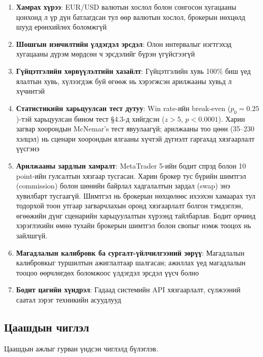 \begin{enumerate}
    \item \textbf{Хамрах хүрээ}: EUR/USD валютын хослол болон сонгосон хугацааны цонхонд л үр дүн батлагдсан тул өөр валютын хослол, брокерын нөхцөлд шууд ерөнхийлөх боломжгүй
    \item \textbf{Шошгын нэвчилтийн үлдэгдэл эрсдэл}: Олон интервалыг нэгтгэхэд хугацааны дүрэм мөрдсөн ч эрсдэлийг бүрэн үгүйсгээгүй
    \item \textbf{Гүйцэтгэлийн хөрвүүлэлтийн хазайлт}: Гүйцэтгэлийн хувь 100\% биш үед ялалтын хувь, хүлээгдэж буй өгөөж нь хэрэгжсэн арилжааны хувьд л хүчинтэй
    \item \textbf{Статистикийн харьцуулсан тест дутуу}: Win rate-ийн break-even ($p_0=0.25$)-тэй харьцуулсан бином тест §4.3-д хийгдсэн ($z>5$, $p<0.0001$). Харин загвар хоорондын McNemar's тест явуулаагүй; арилжааны тоо цөөн (35--230 хэлцэл) нь сценари хоорондын ялгааны хүчтэй дүгнэлт гаргахад хязгаарлалт үүсгэнэ
    \item \textbf{Арилжааны зардлын хамралт}: MetaTrader 5-ийн бодит спрэд болон 10 point-ийн гулсалтын хязгаар тусгасан. Харин брокер тус бүрийн шимтгэл (commission) болон шөнийн байрлал хадгалалтын зардал (swap) энэ хувилбарт тусгаагүй. Шимтгэл нь брокерын нөхцөлөөс ихээхэн хамаарах тул тодорхой тоон утгаар загварчлахын оронд хязгаарлалт болгон тэмдэглэн, өгөөжийн дүнг сценарийн харьцуулалтын хүрээнд тайлбарлав. Бодит орчинд хэрэглэхийн өмнө тухайн брокерын шимтгэл болон свопыг нэмж тооцох нь зайлшгүй.
    \item \textbf{Магадлалын калибровк ба сургалт-үйлчилгээний зөрүү}: Магадлалын калибровкыг туршилтын ажиглалтаар шалгасан; ажиллах үед магадлалын тооцоо өөрчлөгдөх боломжоос үлдэгдэл эрсдэл үүсч болно
    \item \textbf{Бодит цагийн хүндрэл}: Гадаад системийн API хязгаарлалт, сүлжээний саатал зэрэг техникийн асуудлууд
\end{enumerate}

\subsection{Цаашдын чиглэл}

Цаашдын ажлыг гурван үндсэн чиглэлд бүлэглэв.


